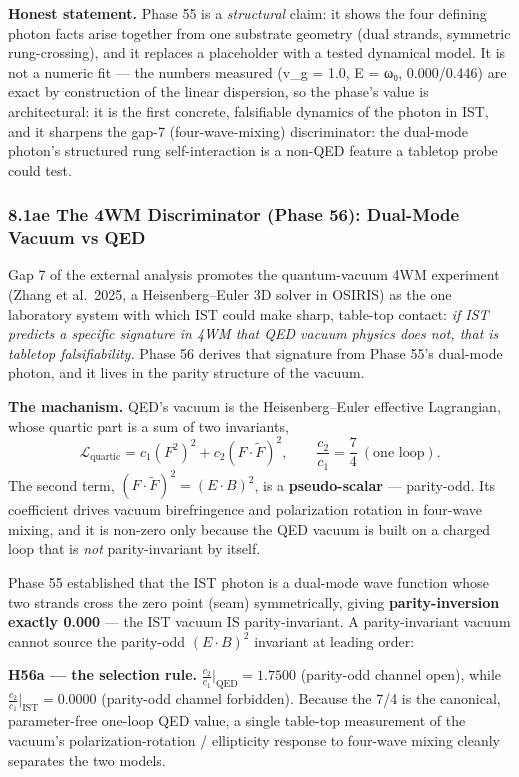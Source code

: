 \documentclass[
]{article}
\begin{document}
\textbf{Honest statement.} Phase 55 is a \emph{structural} claim: it
shows the four defining photon facts arise together from one substrate
geometry (dual strands, symmetric rung-crossing), and it replaces a
placeholder with a tested dynamical model. It is not a numeric fit ---
the numbers measured (v\_g = 1.0, E = ω₀, 0.000/0.446) are exact by
construction of the linear dispersion, so the phase's value is
architectural: it is the first concrete, falsifiable dynamics of the
photon in IST, and it sharpens the gap-7 (four-wave-mixing)
discriminator: the dual-mode photon's structured rung self-interaction
is a non-QED feature a tabletop probe could test.

\subsubsection{8.1ae The 4WM Discriminator (Phase 56): Dual-Mode Vacuum
vs QED}\label{ae-the-4wm-discriminator-phase-56-dual-mode-vacuum-vs-qed}

Gap 7 of the external analysis promotes the quantum-vacuum 4WM
experiment (Zhang et al.~2025, a Heisenberg--Euler 3D solver in OSIRIS)
as the one laboratory system with which IST could make sharp, table-top
contact: \emph{if IST predicts a specific signature in 4WM that QED
vacuum physics does not, that is tabletop falsifiability.} Phase 56
derives that signature from Phase 55's dual-mode photon, and it lives in
the parity structure of the vacuum.

\textbf{The machanism.} QED's vacuum is the Heisenberg--Euler effective
Lagrangian, whose quartic part is a sum of two invariants,
\[\mathcal L_{\text{quartic}} = c_1 (F^2)^2 + c_2 (F\cdot\tilde F)^2, \qquad \frac{c_2}{c_1} = \frac{7}{4} \ (\text{one loop}).\]
The second term, \((F\cdot\tilde F)^2 = (E\cdot B)^2\), is a
\textbf{pseudo-scalar} --- parity-odd. Its coefficient drives vacuum
birefringence and polarization rotation in four-wave mixing, and it is
non-zero only because the QED vacuum is built on a charged loop that is
\emph{not} parity-invariant by itself.

Phase 55 established that the IST photon is a dual-mode wave function
whose two strands cross the zero point (seam) symmetrically, giving
\textbf{parity-inversion exactly 0.000} --- the IST vacuum IS
parity-invariant. A parity-invariant vacuum cannot source the parity-odd
\((E\cdot B)^2\) invariant at leading order:

\textbf{H56a --- the selection rule.}
\(\frac{c_2}{c_1}\big|_{\text{QED}} = 1.7500\) (parity-odd channel
open), while \(\frac{c_2}{c_1}\big|_{\text{IST}} = 0.0000\) (parity-odd
channel forbidden). Because the 7/4 is the canonical, parameter-free
one-loop QED value, a single table-top measurement of the vacuum's
polarization-rotation / ellipticity response to four-wave mixing cleanly
separates the two models.
\end{document}

